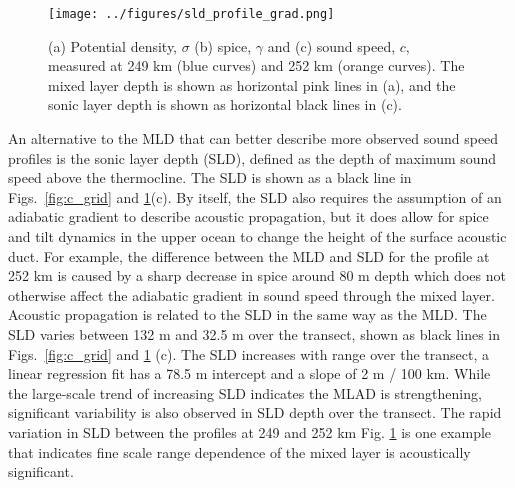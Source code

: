 \documentclass[preprint,NumberedRefs]{JASA}
\begin{document}
\begin{figure}
\texttt{[image: ../figures/sld\_profile\_grad.png]}
    \caption{\label{fig:profiles}{(a) Potential density, $\sigma$ (b) spice, $\gamma$ and (c) sound speed, $c$, measured at 249 km (blue curves) and 252 km (orange curves). The mixed layer depth is shown as horizontal pink lines in (a), and the sonic layer depth is shown as horizontal black lines in (c).}}
\end{figure}

An alternative to the MLD that can better describe more observed sound speed profiles is the sonic layer depth (SLD), defined as the depth of maximum sound speed above the thermocline. The SLD is shown as a black line in Figs.~\ref{fig:c_grid} and \ref{fig:profiles}(c). By itself, the SLD also requires the assumption of an adiabatic gradient to describe acoustic propagation, but it does allow for spice and tilt dynamics in the upper ocean to change the height of the surface acoustic duct. For example, the difference between the MLD and SLD for the profile at 252 km is caused by a sharp decrease in spice around 80 m depth which does not otherwise affect the adiabatic gradient in sound speed through the mixed layer. Acoustic propagation is related to the SLD in the same way as the MLD. The SLD varies between 132 m and 32.5 m over the transect, shown as black lines in Figs.~\ref{fig:c_grid} and \ref{fig:profiles} (c). The SLD increases with range over the transect, a linear regression fit has a 78.5 m intercept and a slope of 2 m / 100 km. While the large-scale trend of increasing SLD indicates the MLAD is strengthening, significant variability is also observed in SLD depth over the transect. The rapid variation in SLD between the profiles at 249 and 252 km Fig. \ref{fig:profiles} is one example that indicates fine scale range dependence of the mixed layer is acoustically significant.
\end{document}
